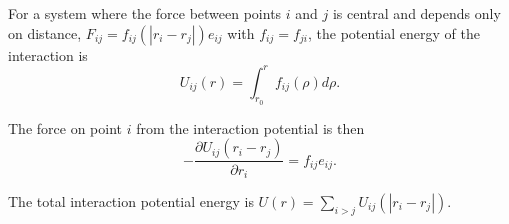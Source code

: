 For a system where the force between points $i$ and $j$ is central and depends only on distance, $F_{ij} = f_{ij}(|r_i - r_j|) e_{ij}$ with $f_{ij} = f_{ji}$, the potential energy of the interaction is
$$U_{ij}(r) = \int_{r_0}^{r} f_{ij}(\rho) d\rho.$$

The force on point $i$ from the interaction potential is then
$$-\frac{\partial U_{ij}(r_i - r_j)}{\partial r_i} = f_{ij} e_{ij}.$$

The total interaction potential energy is $U(r) = \sum_{i>j} U_{ij}(|r_i - r_j|)$.
